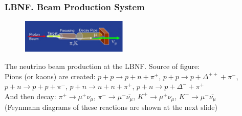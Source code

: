 \begin{frame}\frametitle{LBNF. Beam Production System}
\scriptsize
\begin{figure}
\label{fig:LBNF_nuBeam}
\centering
\includegraphics[width=0.45\textwidth, keepaspectratio=true]{figs/LBNF_nuBeam.png}  
\end{figure}
The neutrino beam production at the LBNF. Source of figure: \cite{ref_LBNFweb}\\
Pions (or kaons) are created: $p+p \rightarrow p+n+\pi^+$, $p+p \rightarrow p+\Delta^{++}+\pi^-$, $p+n \rightarrow p+p+\pi^-$, $p+n \rightarrow n+n+\pi^+$, $p+n \rightarrow p+\Delta^{-}+\pi^+$\\
And then decay: $\pi^+ \rightarrow \mu^+\nu_\mu$, $\pi^- \rightarrow \mu^-\bar{\nu_\mu}$, $K^+ \rightarrow \mu^+\nu_\mu$, $K^- \rightarrow \mu^-\bar{\nu_\mu}$\\
(Feynmann diagrams of these reactions are shown at the next slide)
\end{frame}

